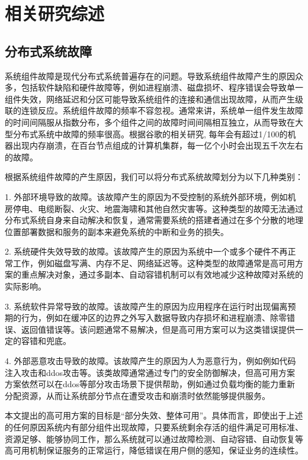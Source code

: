 
\chapter{相关研究综述}

\section{分布式系统故障}

系统组件故障是现代分布式系统普遍存在的问题。导致系统组件故障产生的原因众多，包括软件缺陷和硬件故障等，例如进程崩溃、磁盘损坏、程序错误会导致单一组件失效，网络延迟和分区可能导致系统组件的连接和通信出现故障，从而产生级联的连锁反应。系统组件故障的频率不容忽视。通常来讲，系统单一组件发生故障的时间间隔服从指数分布，多个组件之间的故障时间间隔相互独立，从而导致在大型分布式系统中故障的频率很高。根据谷歌的相关研究\cite{beyer2016site}, 每年会有超过1/100的机器出现内存崩溃，在百台节点组成的计算机集群，每一亿个小时会出现五千次左右的故障。

根据系统组件故障的产生原因，我们可以将分布式系统故障划分为以下几种类别\cite{michaud20062}：

1. 外部环境导致的故障。该故障产生的原因为不受控制的系统外部环境，例如机房停电、电缆断裂、火灾、地震海啸和其他自然灾害等。这种类型的故障无法通过分布式系统自身来自动解决和恢复，通常需要系统的搭建者通过在多个分散的地理位置部署数据和服务的副本来避免系统的中断和业务的损失。

2. 系统硬件失效导致的故障。该故障产生的原因为系统中一个或多个硬件不再正常工作，例如磁盘写满、内存不足、网络延迟等。这种类型的故障通常是高可用方案的重点解决对象，通过多副本、自动容错机制可以有效地减少这种故障对系统的实际影响。

3. 系统软件异常导致的故障。该故障产生的原因为应用程序在运行时出现偏离预期的行为，例如在缓冲区的边界之外写入数据导致内存损坏和进程崩溃、除零错误、返回值错误等。该问题通常不易解决，但是高可用方案可以为这类错误提供一定的容错和兜底。

4. 外部恶意攻击导致的故障。该故障产生的原因为人为恶意行为，例如例如代码注入攻击和ddos攻击等。该类故障通常通过专门的安全防御解决，但高可用方案方案依然可以在ddos等部分攻击场景下提供帮助，例如通过负载均衡的能力重新分配资源，从而让系统部分节点在遭受攻击和崩溃时依然能够提供服务。

本文提出的高可用方案的目标是“部分失效、整体可用”。具体而言，即使出于上述的任何原因系统内有部分组件出现故障，只要系统剩余存活的组件满足可用标准、资源足够、能够协同工作，那么系统就可以通过故障检测、自动容错、自动恢复等高可用机制保证服务的正常运行，降低错误在用户侧的感知，保证业务的连续性。

